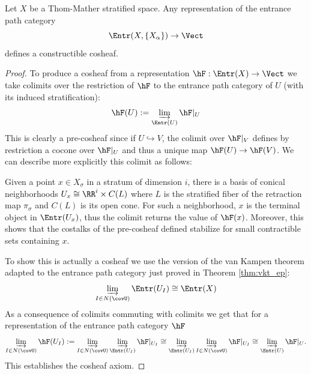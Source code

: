 \begin{thm}
	Let $X$ be a Thom-Mather stratified space. Any representation of the entrance path category 
	\[
		\Entr(X,\{X_{\alpha}\}) \to \Vect
	\]
	defines a constructible cosheaf.
\end{thm}
\begin{proof}
	To produce a cosheaf from a representation $\hF:\Entr(X)\to\Vect$ we take colimits over the restriction of $\hF$ to the entrance path category of $U$ (with its induced stratification):
	\[
	\hF(U):= \varinjlim_{\Entr(U)} \hF|_U
	\]
	This is clearly a pre-cosheaf since if $U\hookrightarrow V$, the colimit over $\hF|_V$ defines by restriction a cocone over $\hF|_U$ and thus a unique map $\hF(U)\to\hF(V)$. We can describe more explicitly this colimit as follows:
 
	Given a point $x\in X_{\sigma}$ in a stratum of dimension $i$, there is a basis of conical neighborhoods $U_x\cong \RR^i\times C(L)$ where $L$ is the stratified fiber of the retraction map $\pi_{\sigma}$ and $C(L)$ is its open cone. For such a neighborhood, $x$ is the terminal object in $\Entr(U_x)$, thus the colimit returns the value of $\hF(x)$. Moreover, this shows that the costalks of the pre-cosheaf defined stabilize for small contractible sets containing $x$.
	
	To show this is actually a cosheaf we use the version of the van Kampen theorem adapted to the entrance path category just proved in Theorem \ref{thm:vkt_ep}:
	\[
		\varinjlim_{I\in N(\covU)} \Entr(U_I) \cong \Entr(X)
	\]
	As a consequence of colimits commuting with colimits we get that for a representation of the entrance path category $\hF$
	\[
		 \varinjlim_{I\in N(\covU)} \hF(U_I):=\varinjlim_{I\in N(\covU)} \varinjlim_{\Entr(U_I)} \hF|_{U_I} \cong  \varinjlim_{\Entr(U_I)} \varinjlim_{I\in N(\covU)} \hF|_{U_I} \cong \varinjlim_{\Entr(U)} \hF|_U.
	\]
	This establishes the cosheaf axiom.
\end{proof}


